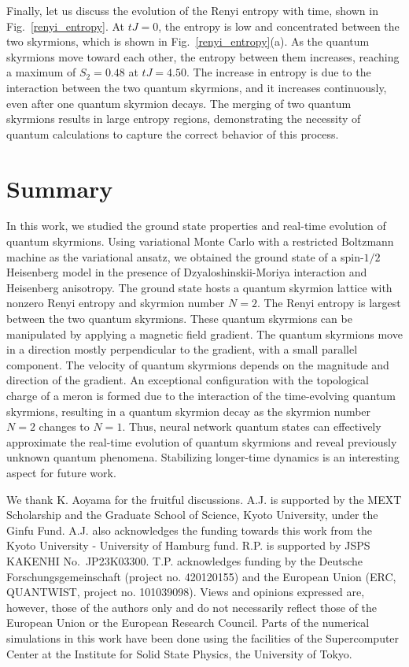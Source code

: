 \documentclass[aps,prb,twocolumn,superscriptaddress,a4paper,longbibliography]{revtex4-2}
\begin{document}
Finally, let us discuss the evolution of the Renyi entropy with time, shown in Fig.~\ref{renyi_entropy}. At $tJ=0$, the entropy is low and concentrated between the two skyrmions, which is shown in Fig.~\ref{renyi_entropy}(a). As the quantum skyrmions move toward each other, the entropy between them increases, reaching a maximum of $S_2=0.48$ at $tJ=4.50$. The increase in entropy is due to the interaction between the two quantum skyrmions, and it increases continuously, even after one quantum skyrmion decays. The merging of two quantum skyrmions results in large entropy regions, demonstrating the necessity of quantum calculations to capture the correct behavior of this process.

\section{Summary}
\label{summary}

In this work, we studied the ground state properties and real-time evolution of quantum skyrmions. Using variational Monte Carlo with a restricted Boltzmann machine as the variational ansatz, we obtained the ground state of a spin-$1/2$ Heisenberg model in the presence of Dzyaloshinskii-Moriya interaction and Heisenberg anisotropy. The ground state hosts a quantum skyrmion lattice with nonzero Renyi entropy and skyrmion number $N=2$. The Renyi entropy is largest between the two quantum skyrmions. These quantum skyrmions can be manipulated by applying a magnetic field gradient. The quantum skyrmions move in a direction mostly perpendicular to the gradient, with a small parallel component. The velocity of quantum skyrmions depends on the magnitude and direction of the gradient. An exceptional configuration with the topological charge of a meron is formed due to the interaction of the time-evolving quantum skyrmions, resulting in a quantum skyrmion decay as the skyrmion number $N=2$ changes to $N=1$. Thus, neural network quantum states can effectively approximate the real-time evolution of quantum skyrmions and reveal previously unknown quantum phenomena. Stabilizing longer-time dynamics is an interesting aspect for future work.

\begin{acknowledgements}
We thank K. Aoyama for the fruitful discussions. A.J. is supported by the MEXT Scholarship and the Graduate School of Science, Kyoto University, under the Ginfu Fund. A.J. also acknowledges the funding towards this work from the Kyoto University - University of Hamburg fund. R.P. is supported by JSPS KAKENHI No.~JP23K03300. T.P. acknowledges funding by the Deutsche Forschungsgemeinschaft (project no. 420120155) and the European Union (ERC, QUANTWIST, project no. 101039098). Views and opinions expressed are, however, those of the authors only and do not necessarily reflect those of the European Union or the European Research Council. Parts of the numerical simulations in this work have been done using the facilities of the Supercomputer Center at the Institute for Solid State Physics, the University of Tokyo.
\end{acknowledgements}
\end{document}
